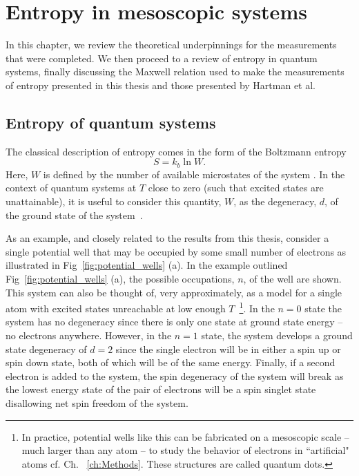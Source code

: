 
\chapter{Entropy in mesoscopic systems}
\label{ch:Theory}

In this chapter, we review the theoretical underpinnings for the measurements that were completed. We then proceed to a review of entropy in quantum systems, finally discussing the Maxwell relation used to make the measurements of entropy presented in this thesis and those presented by Hartman et al.

\section{Entropy of quantum systems}
The classical description of entropy comes in the form of the Boltzmann entropy
\begin{equation}
	\label{eqn:b_entropy}
	S = k_b \ln W.
\end{equation}
Here, $W$ is defined by the number of available microstates of the system \cite{schroeder}. In the context of quantum systems at $T$ close to zero (such that excited states are unattainable), it is useful to consider this quantity, $W$, as the degeneracy, $d$, of the ground state of the system~\cite{mcquarrie}. 

As an example, and closely related to the results from this thesis, consider a single potential well that may be occupied by some small number of electrons as illustrated in Fig~\ref{fig:potential_wells} (a).  In the example outlined Fig~\ref{fig:potential_wells} (a), the possible occupations, $n$, of the well are shown. This system can also be thought of, very approximately, as a model for a single atom with excited states unreachable at low enough $T$~\footnote{In practice, potential wells like this can be fabricated on a mesoscopic scale -- much larger than any atom -- to study the behavior of electrons in ``artificial" atoms cf. Ch. ~\ref{ch:Methods}. These structures are called quantum dots.}. In the $n = 0$ state the system has no degeneracy since there is only one state at ground state energy -- no electrons anywhere. However, in the $n=1$ state, the system develops a ground state degeneracy of $d = 2$ since the single electron will be in either a spin up or spin down state, both of which will be of the same energy. Finally, if a second electron is added to the system, the spin degeneracy of the system will break as the lowest energy state of the pair of electrons will be a spin singlet state disallowing net spin freedom of the system. 

